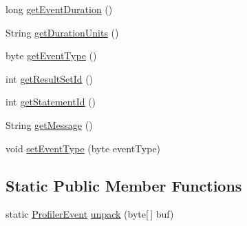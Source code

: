 \begin{DoxyCompactItemize}
\item 
long \mbox{\hyperlink{classcom_1_1mysql_1_1cj_1_1log_1_1_profiler_event_impl_a52efd224f93dd9a3238995df02e4f330}{get\+Event\+Duration}} ()
\item 
String \mbox{\hyperlink{classcom_1_1mysql_1_1cj_1_1log_1_1_profiler_event_impl_a412e4b084f1c75d2ce0043bef41c2647}{get\+Duration\+Units}} ()
\item 
byte \mbox{\hyperlink{classcom_1_1mysql_1_1cj_1_1log_1_1_profiler_event_impl_a617ef1b80526a6401966ce38ad320872}{get\+Event\+Type}} ()
\item 
int \mbox{\hyperlink{classcom_1_1mysql_1_1cj_1_1log_1_1_profiler_event_impl_a2b432bffc0257f4825222bb9946a44ba}{get\+Result\+Set\+Id}} ()
\item 
int \mbox{\hyperlink{classcom_1_1mysql_1_1cj_1_1log_1_1_profiler_event_impl_a3a30e724b4b86369376e1a7402f16d66}{get\+Statement\+Id}} ()
\item 
String \mbox{\hyperlink{classcom_1_1mysql_1_1cj_1_1log_1_1_profiler_event_impl_aea930b7a299a44946aea7544c5df2a7d}{get\+Message}} ()
\item 
void \mbox{\hyperlink{classcom_1_1mysql_1_1cj_1_1log_1_1_profiler_event_impl_a1326d8fa5e3acbe79a145469f7316843}{set\+Event\+Type}} (byte event\+Type)
\end{DoxyCompactItemize}
\subsection*{Static Public Member Functions}
\begin{DoxyCompactItemize}
\item 
static \mbox{\hyperlink{interfacecom_1_1mysql_1_1cj_1_1log_1_1_profiler_event}{Profiler\+Event}} \mbox{\hyperlink{classcom_1_1mysql_1_1cj_1_1log_1_1_profiler_event_impl_aba1059ef66f8246a1e69d24af53dc9f0}{unpack}} (byte\mbox{[}$\,$\mbox{]} buf)
\end{DoxyCompactItemize}
